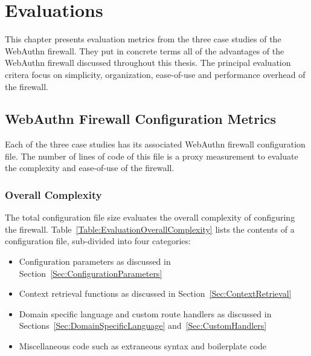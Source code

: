
\chapter{Evaluations}\label{Chap:Evaluations}

This chapter presents evaluation metrics from the three case studies of the WebAuthn firewall. They put in concrete terms all of the advantages of the WebAuthn firewall discussed throughout this thesis. The principal evaluation critera focus on simplicity, organization, ease-of-use and performance overhead of the firewall.

\section{WebAuthn Firewall Configuration Metrics}

Each of the three case studies has its associated WebAuthn firewall configuration file. The number of lines of code of this file is a proxy measurement to evaluate the complexity and ease-of-use of the firewall. 

\subsection{Overall Complexity}

The total configuration file size evaluates the overall complexity of configuring the firewall. Table~\ref{Table:EvaluationOverallComplexity} lists the contents of a configuration file, sub-divided into four categories:

\begin{itemize}[nosep]

\item Configuration parameters as discussed in Section~\ref{Sec:ConfigurationParameters}

\item Context retrieval functions as discussed in Section~\ref{Sec:ContextRetrieval}

\item Domain specific language and custom route handlers as discussed in Sections~\ref{Sec:DomainSpecificLanguage} and~\ref{Sec:CustomHandlers}

\item Miscellaneous code such as extraneous syntax and boilerplate code

\end{itemize}

